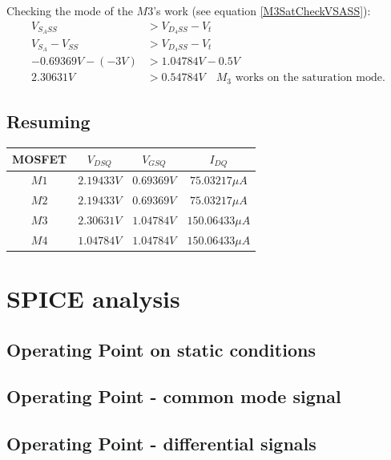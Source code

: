 \documentclass[10pt,a4paper]{book}
\begin{document}
Checking the mode of the $M3$'s work (see equation \ref{M3SatCheckVSASS}):
\begin{align}
V_{{S_A}SS} &> V_{{D_4}SS} - V_t\\
V_{S_A} - V_{SS} &> V_{{D_4}SS} - V_t\\
-0.69369V - (-3V) &> 1.04784V - 0.5V\\
2.30631V &> 0.54784V \quad M_3\text{ works on the saturation mode.}
\end{align}

\subsection{Resuming}
\begin{tabular}{|c|c|c|c|}
\hline
MOSFET & $V_{DSQ}$ & $V_{GSQ}$ & $I_{DQ}$ \\
\hline
$M1$ & $2.19433V$ & $0.69369V$ & $75.03217\mu A$ \\
\hline
$M2$ & $2.19433V$ & $0.69369V$ & $75.03217\mu A$ \\
\hline
$M3$ & $2.30631V$ & $1.04784V$ & $150.06433 \mu A$ \\
\hline
$M4$ & $1.04784V$ & $1.04784V$ & $150.06433 \mu A$ \\
\hline

\end{tabular}

\section{SPICE analysis}
\subsection{Operating Point on static conditions}



\subsection{Operating Point - common mode signal}



\subsection{Operating Point - differential signals}


\end{document}
